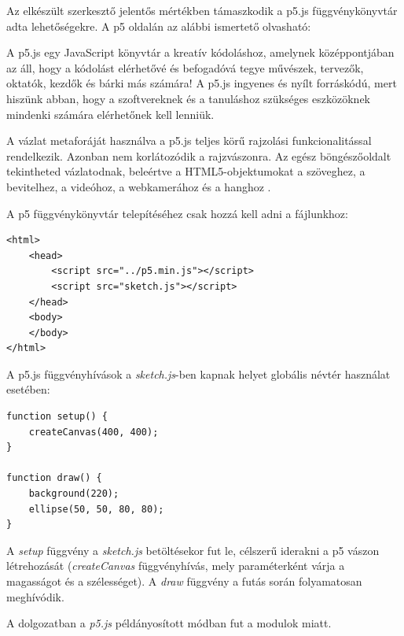 



Az elkészült szerkesztő jelentős mértékben támaszkodik a p5.js függvénykönyvtár adta lehetőségekre. A p5 oldalán az alábbi ismertető olvasható:


A p5.js egy JavaScript könyvtár a kreatív kódoláshoz, amelynek középpontjában az áll, hogy a kódolást elérhetővé és befogadóvá tegye művészek, tervezők, oktatók, kezdők és bárki más számára! A p5.js ingyenes és nyílt forráskódú, mert hiszünk abban, hogy a szoftvereknek és a tanuláshoz szükséges eszközöknek mindenki számára elérhetőnek kell lenniük.

A vázlat metaforáját használva a p5.js teljes körű rajzolási funkcionalitással rendelkezik. Azonban nem korlátozódik a rajzvászonra. Az egész böngészőoldalt tekintheted vázlatodnak, beleértve a HTML5-objektumokat a szöveghez, a bevitelhez, a videóhoz, a webkamerához és a hanghoz \cite{p5js}.


A p5 függvénykönyvtár telepítéséhez csak hozzá kell adni a fájlunkhoz:

\begin{lstlisting}[style=html]
<html>
	<head>
		<script src="../p5.min.js"></script>
		<script src="sketch.js"></script>
	</head>
	<body>
	</body>
</html>
\end{lstlisting}


A p5.js függvényhívások a \textit{sketch.js}-ben kapnak helyet globális névtér használat esetében:

\begin{lstlisting}[style=es6]
function setup() {
	createCanvas(400, 400);
}

function draw() {
	background(220);
	ellipse(50, 50, 80, 80);
}
\end{lstlisting}

A \textit{setup} függvény a \textit{sketch.js} betöltésekor fut le, célszerű iderakni a p5 vászon létrehozását (\textit{createCanvas} függvényhívás, mely paraméterként várja a magasságot és a szélességet). A \textit{draw} függvény a futás során folyamatosan meghívódik.

A dolgozatban a \textit{p5.js} példányosított módban fut a modulok miatt.

